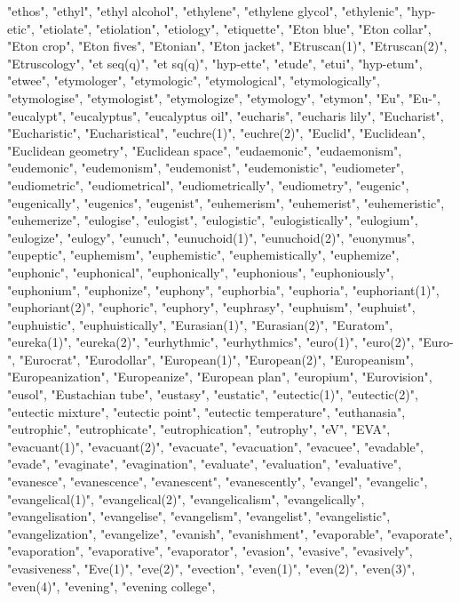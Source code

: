 "ethos",
"ethyl",
"ethyl alcohol",
"ethylene",
"ethylene glycol",
"ethylenic",
"hyp-etic",
"etiolate",
"etiolation",
"etiology",
"etiquette",
"Eton blue",
"Eton collar",
"Eton crop",
"Eton fives",
"Etonian",
"Eton jacket",
"Etruscan(1)",
"Etruscan(2)",
"Etruscology",
"et seq(q)",
"et sq(q)",
"hyp-ette",
"etude",
"etui",
"hyp-etum",
"etwee",
"etymologer",
"etymologic",
"etymological",
"etymologically",
"etymologise",
"etymologist",
"etymologize",
"etymology",
"etymon",
"Eu",
"Eu-",
"eucalypt",
"eucalyptus",
"eucalyptus oil",
"eucharis",
"eucharis lily",
"Eucharist",
"Eucharistic",
"Eucharistical",
"euchre(1)",
"euchre(2)",
"Euclid",
"Euclidean",
"Euclidean geometry",
"Euclidean space",
"eudaemonic",
"eudaemonism",
"eudemonic",
"eudemonism",
"eudemonist",
"eudemonistic",
"eudiometer",
"eudiometric",
"eudiometrical",
"eudiometrically",
"eudiometry",
"eugenic",
"eugenically",
"eugenics",
"eugenist",
"euhemerism",
"euhemerist",
"euhemeristic",
"euhemerize",
"eulogise",
"eulogist",
"eulogistic",
"eulogistically",
"eulogium",
"eulogize",
"eulogy",
"eunuch",
"eunuchoid(1)",
"eunuchoid(2)",
"euonymus",
"eupeptic",
"euphemism",
"euphemistic",
"euphemistically",
"euphemize",
"euphonic",
"euphonical",
"euphonically",
"euphonious",
"euphoniously",
"euphonium",
"euphonize",
"euphony",
"euphorbia",
"euphoria",
"euphoriant(1)",
"euphoriant(2)",
"euphoric",
"euphory",
"euphrasy",
"euphuism",
"euphuist",
"euphuistic",
"euphuistically",
"Eurasian(1)",
"Eurasian(2)",
"Euratom",
"eureka(1)",
"eureka(2)",
"eurhythmic",
"eurhythmics",
"euro(1)",
"euro(2)",
"Euro-",
"Eurocrat",
"Eurodollar",
"European(1)",
"European(2)",
"Europeanism",
"Europeanization",
"Europeanize",
"European plan",
"europium",
"Eurovision",
"eusol",
"Eustachian tube",
"eustasy",
"eustatic",
"eutectic(1)",
"eutectic(2)",
"eutectic mixture",
"eutectic point",
"eutectic temperature",
"euthanasia",
"eutrophic",
"eutrophicate",
"eutrophication",
"eutrophy",
"eV",
"EVA",
"evacuant(1)",
"evacuant(2)",
"evacuate",
"evacuation",
"evacuee",
"evadable",
"evade",
"evaginate",
"evagination",
"evaluate",
"evaluation",
"evaluative",
"evanesce",
"evanescence",
"evanescent",
"evanescently",
"evangel",
"evangelic",
"evangelical(1)",
"evangelical(2)",
"evangelicalism",
"evangelically",
"evangelisation",
"evangelise",
"evangelism",
"evangelist",
"evangelistic",
"evangelization",
"evangelize",
"evanish",
"evanishment",
"evaporable",
"evaporate",
"evaporation",
"evaporative",
"evaporator",
"evasion",
"evasive",
"evasively",
"evasiveness",
"Eve(1)",
"eve(2)",
"evection",
"even(1)",
"even(2)",
"even(3)",
"even(4)",
"evening",
"evening college",
